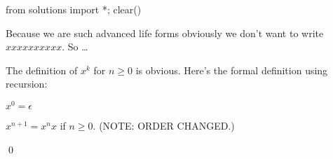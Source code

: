 \begin{python0}
from solutions import *; clear()
\end{python0}

 Because we are such advanced life forms obviously we don't want
 to write $xxxxxxxxxx$. So \ldots

 \begin{defn}  
 The definition of $x^k$ for $n \geq 0$ is obvious.
 Here's the formal definition using recursion:
 \begin{tightlist}
  \item $x^0 = \epsilon$
  \item $x^{n+1} = x^n x$ if $n \geq 0$. (NOTE: ORDER CHANGED.)
 \end{tightlist}
 \qed
\end{defn}


